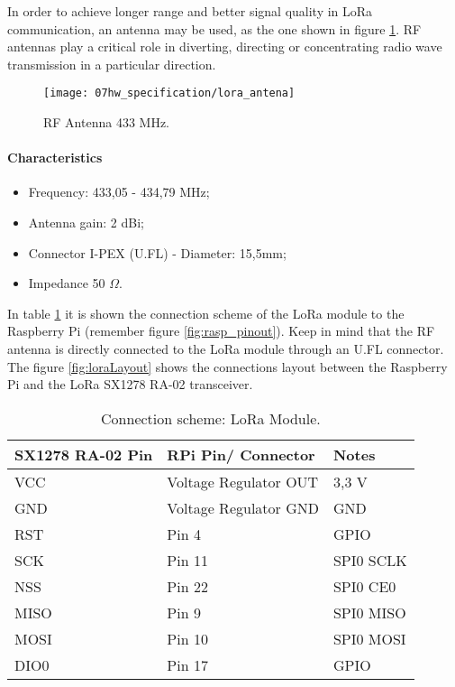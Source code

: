In order to achieve longer range and better signal quality in LoRa communication, an antenna may be used, as the one shown in figure \ref{fig:lora_antena}. RF antennas play a critical role in diverting, directing or concentrating radio wave transmission in a particular direction. 


\begin{figure}[H]
	\centering
	\texttt{[image: 07hw\_specification/lora\_antena]}
	\caption{RF Antenna 433 MHz.}
	\label{fig:lora_antena}
\end{figure}

\paragraph*{Characteristics}
\begin{itemize}
	\item Frequency: 433,05 - 434,79 MHz;
	\item Antenna gain: 2 dBi;
	\item Connector I-PEX (U.FL) - Diameter: 15,5mm;
	\item Impedance 50 $\Omega$.
\end{itemize}


In table \ref{table:connect_lora} it is shown the connection scheme of the LoRa module to the Raspberry Pi (remember figure \ref{fig:rasp_pinout}). Keep in mind that the RF antenna is directly connected to the LoRa module through an U.FL connector. The figure \ref{fig:loraLayout} shows the connections layout between the Raspberry Pi and the LoRa SX1278 RA-02 transceiver.

\begin{table}[H]
	\centering
	\begin{tabular}{|m{4cm}|m{5cm}|m{3cm}|}
		\hline
		\textbf{SX1278 RA-02 Pin} & \textbf{RPi Pin/ Connector} & \textbf{Notes} 
		\\\hline\hline
		
		VCC & Voltage Regulator OUT & 3,3 V
		\\\hline
		GND & Voltage Regulator GND & GND
		\\\hline
		RST & Pin 4 & GPIO
		\\\hline
		SCK & Pin 11 & SPI0 SCLK
		\\\hline
		NSS & Pin 22 & SPI0 CE0
		\\\hline
		MISO & Pin 9 & SPI0 MISO
		\\\hline
		MOSI & Pin 10 & SPI0 MOSI
		\\\hline
		DIO0 & Pin 17 & GPIO
		\\\hline
	\end{tabular}
	
	\caption{Connection scheme: LoRa Module.}
	\label{table:connect_lora}
\end{table}


